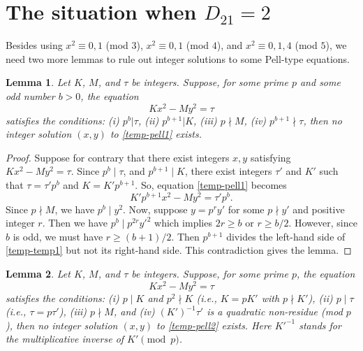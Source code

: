 \documentclass[12pt]{article}
\newtheorem{lem}{Lemma}
\begin{document}
\section{The situation when $D_{21} = 2$}

Besides using $x^2 \equiv 0, 1$ (mod $3$), $x^2 \equiv 0, 1$ (mod $4$), and $x^2 \equiv 0, 1, 4$ (mod $5$), we need two more lemmas to rule out integer solutions to some Pell-type equations.

\begin{lem} \label{lem-Pell-check-1}
Let $K$, $M$, and $\tau$ be integers. Suppose, for some prime $p$ and some odd number $b > 0$, the equation 
\begin{equation} \label{temp-pell1}
    K x^2 - M y^2=\tau
\end{equation}
satisfies the conditions: (i) $p^{b}|\tau$, (ii) $p^{b+1}|K$, (iii) $p\nmid M$, (iv) $p^{b+1}\nmid\tau$, then no integer solution $(x,y)$ to \eqref{temp-pell1} exists.
\end{lem}
\begin{proof}
Suppose for contrary that there exist integers $x,y$ satisfying $Kx^2-My^2=\tau$. Since $p^b \mid \tau$, and $p^{b+1} \mid K$, there exist integers $\tau'$ and $K'$ such that $\tau=\tau'p^b$ and $K=K'p^{b+1}$. So, equation \eqref{temp-pell1} becomes
\begin{equation} \label{temp-temp1}
    K' p^{b+1} x^2- M y^2=\tau' p^b.
\end{equation}
Since $p \nmid M$, we have $p^b \mid y^2$. Now, suppose $y = p^r y'$ for some $p \nmid y'$ and positive integer $r$. Then we have $p^b \mid p^{2r} y'^2$ which implies $2r \ge b$ or $r \ge b/2$. However, since $b$ is odd, we must have $r \ge (b + 1)/2$. Then $p^{b+1}$ divides the left-hand side of \eqref{temp-temp1} but not its right-hand side. This contradiction gives the lemma.
\end{proof}

\begin{lem} \label{lem-Pell-check-2}
Let $K$, $M$, and $\tau$ be integers. Suppose, for some prime $p$, the equation 
\begin{equation} \label{temp-pell2}
    Kx^2-My^2=\tau  
\end{equation}
satisfies the conditions: (i) $p \mid K$ and $p^2 \nmid K$ (i.e., $K = p K'$ with $p \nmid K'$), (ii) $p \mid \tau$ (i.e., $\tau = p \tau'$), (iii) $p\nmid M$, and (iv) $(K')^{-1}\tau'$ is a quadratic non-residue (mod $p$), then no integer solution $(x,y)$ to \eqref{temp-pell2} exists. Here $K'^{-1}$ stands for the multiplicative inverse of $K' \pmod{p}$.
\end{lem}
\end{document}
